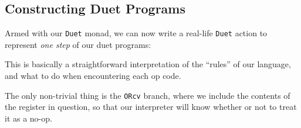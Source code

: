 \documentclass[]{article}
\newenvironment{Shaded}{}{}
\newcommand{\CommentTok}[1]{\textcolor[rgb]{0.38,0.63,0.69}{\textit{#1}}}
\newcommand{\DataTypeTok}[1]{\textcolor[rgb]{0.56,0.13,0.00}{#1}}
\newcommand{\DecValTok}[1]{\textcolor[rgb]{0.25,0.63,0.44}{#1}}
\newcommand{\FunctionTok}[1]{\textcolor[rgb]{0.02,0.16,0.49}{#1}}
\newcommand{\KeywordTok}[1]{\textcolor[rgb]{0.00,0.44,0.13}{\textbf{#1}}}
\newcommand{\NormalTok}[1]{#1}
\newcommand{\OtherTok}[1]{\textcolor[rgb]{0.00,0.44,0.13}{#1}}
\begin{document}
\hypertarget{constructing-duet-programs}{%
\subsection{Constructing Duet Programs}\label{constructing-duet-programs}}

Armed with our \texttt{Duet} monad, we can now write a real-life \texttt{Duet}
action to represent \emph{one step} of our duet programs:

\begin{Shaded}
\end{Shaded}

This is basically a straightforward interpretation of the ``rules'' of our
language, and what to do when encountering each op code.

The only non-trivial thing is the \texttt{ORcv} branch, where we include the
contents of the register in question, so that our interpreter will know whether
or not to treat it as a no-op.
\end{document}

